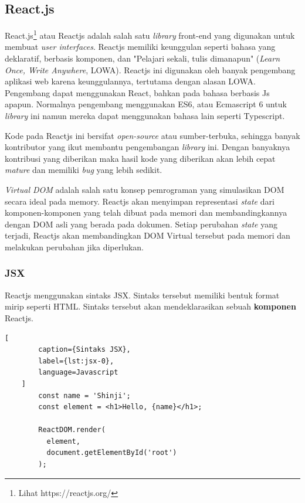 \subsection{React.js}
    React.js\footnote{Lihat https://reactjs.org/} atau Reactjs adalah salah satu
    \textit{library} front-end yang digunakan untuk membuat \textit{user
    interfaces}\cite{facebook:react-homepage}. Reactjs memiliki keunggulan
    seperti bahasa yang deklaratif, berbasis komponen, dan "Pelajari sekali,
    tulis dimanapun" (\textit{Learn Once, Write Anywhere},
    LOWA)\cite{facebook:react-homepage}. Reactjs ini digunakan oleh banyak
    pengembang aplikasi web karena keunggulannya, tertutama dengan alasan LOWA.
    Pengembang dapat menggunakan React, bahkan pada bahasa berbasis Js apapun.
    Normalnya pengembang menggunakan ES6, atau Ecmascript 6 untuk
    \textit{library} ini namun mereka dapat menggunakan bahasa lain seperti
    Typescript\cite{typescript:react-ts}.
        
    Kode pada Reactjs ini bersifat \textit{open-source} atau sumber-terbuka,
    sehingga banyak kontributor yang ikut membantu pengembangan \textit{library}
    ini. Dengan banyaknya kontribusi yang diberikan maka hasil kode yang
    diberikan akan lebih cepat \textit{mature} dan memiliki \textit{bug} yang
    lebih sedikit.

    \textit{Virtual DOM} adalah salah satu konsep pemrograman yang simulasikan
    DOM secara ideal pada memory\cite{facebook:react-faq}. Reactjs akan
    menyimpan representasi \textit{state} dari komponen-komponen yang telah
    dibuat pada memori dan membandingkannya dengan DOM asli yang berada pada
    dokumen. Setiap perubahan \textit{state} yang terjadi, Reactjs akan
    membandingkan DOM Virtual tersebut pada memori dan melakukan perubahan jika
    diperlukan.
    
    \subsubsection{JSX}
    Reactjs menggunakan sintaks JSX. Sintaks tersebut memiliki bentuk format
    mirip seperti HTML. Sintaks tersebut akan mendeklarasikan sebuah
    \textbf{komponen} Reactjs.
    \begin{lstlisting}[
        caption={Sintaks JSX}, 
        label={lst:jsx-0}, 
        language=Javascript
    ]
        const name = 'Shinji';
        const element = <h1>Hello, {name}</h1>;
        
        ReactDOM.render(
          element,
          document.getElementById('root')
        );
    \end{lstlisting}
    
